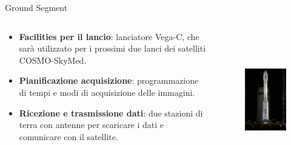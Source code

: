 \documentclass[xcolor=table]{beamer}
\begin{document}
\begin{frame}{Ground Segment}
\begin{columns}
            \begin{block}{}
            \begin{itemize}
                \item \textbf{Facilities per il lancio}: lanciatore Vega-C, che sarà utilizzato per i prossimi due lanci dei satelliti COSMO-SkyMed.
                \item \textbf{Pianificazione acquisizione}: programmazione di tempi e modi di acquisizione delle immagini.
                \item \textbf{Ricezione e trasmissione dati}: due stazioni di terra con antenne per scaricare i dati e comunicare con il satellite.
            \end{itemize}
            \end{block}
            
            \begin{figure}
                \centering
                \includegraphics[height=6cm]{vega.jpg}
            \end{figure}
 \end{columns}

\end{frame}
\end{document}
